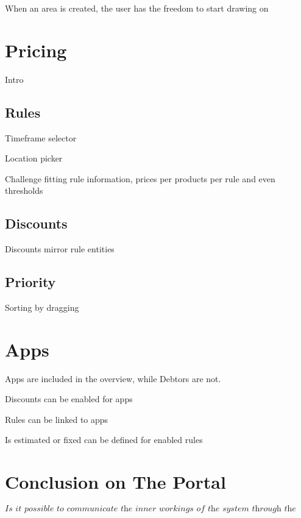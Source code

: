 When an area is created, the user has the freedom to start drawing on

%
\section{Pricing}
Intro

\subsection{Rules}
Timeframe selector

Location picker

Challenge fitting rule information, prices per products per rule and even thresholds

\subsection{Discounts}
Discounts mirror rule entities

\subsection{Priority}
Sorting by dragging

%
\section{Apps}
Apps are included in the overview, while Debtors are not.

Discounts can be enabled for apps

Rules can be linked to apps

Is estimated or fixed can be defined for enabled rules


\section{Conclusion on The Portal}
\[\textit{Is it possible to communicate the inner workings of the system through the user interface?}\]\hfill

